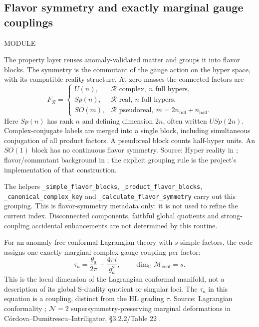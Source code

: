 \documentclass[11pt,a4paper]{article}
\numberwithin{equation}{section}
\newcommand{\code}[1]{{\small\nolinkurl{#1}}}
\newcommand{\file}[1]{\par{\small\sffamily\color{muted}MODULE \quad\texttt{\detokenize{#1}}}\par}
\newcommand{\CC}{\mathbb C}
\newcommand{\src}[1]{{\small\color{muted}Source: #1.}\par}
\begin{document}
\subsection{Flavor symmetry and exactly marginal gauge couplings}
\file{common/n2_theory_properties.py}
The property layer reuses anomaly-validated matter and groups it into flavor
blocks. The symmetry is the commutant of the gauge action on the hyper space,
with its compatible reality structure. At zero masses the connected factors are
\begin{equation}
 F_{\mathcal R}=\begin{cases}
 U(n),&\mathcal R\text{ complex},\ n\text{ full hypers},\\
 Sp(n),&\mathcal R\text{ real},\ n\text{ full hypers},\\
 SO(m),&\mathcal R\text{ pseudoreal},\ m=2n_{\mathrm{full}}+n_{\mathrm{half}}.
 \end{cases}\label{eq:flavor-blocks}
\end{equation}
Here $Sp(n)$ has rank $n$ and defining dimension $2n$, often written $USp(2n)$.
Complex-conjugate labels are merged into a single block, including simultaneous
conjugation of all product factors. A pseudoreal block counts half-hyper units.
An $SO(1)$ block has no continuous flavor symmetry.
\src{Hyper reality in \cite{bt}; flavor/commutant background in \cite{tachikawa};
the explicit grouping rule is the project's implementation of that construction}

The helpers \code{_simple_flavor_blocks}, \code{_product_flavor_blocks},
\code{_canonical_complex_key} and \code{_calculate_flavor_symmetry} carry out
this grouping. This is flavor-symmetry metadata only: it is not used to refine
the current index. Disconnected components, faithful global quotients and
strong-coupling accidental enhancements are not determined by this routine.

For an anomaly-free conformal Lagrangian theory with $s$ simple factors, the
code assigns one exactly marginal complex gauge coupling per factor:
\begin{equation}
 \tau_a=\frac{\theta_a}{2\pi}+\frac{4\pi i}{g_a^2},\qquad
 \dim_\CC\mathcal M_{\mathrm{conf}}=s.
 \label{eq:marginal}
\end{equation}
This is the local dimension of the Lagrangian conformal manifold, not a
description of its global S-duality quotient or singular loci. The
$\tau_a$ in this equation is a coupling, distinct from the HL grading $\tau$.
\src{Lagrangian conformality \cite{bt}; $\mathcal N=2$ supersymmetry-preserving
marginal deformations in C\'ordova--Dumitrescu--Intriligator,
\S3.2.2/Table 22 \cite{cdi}}
\end{document}
